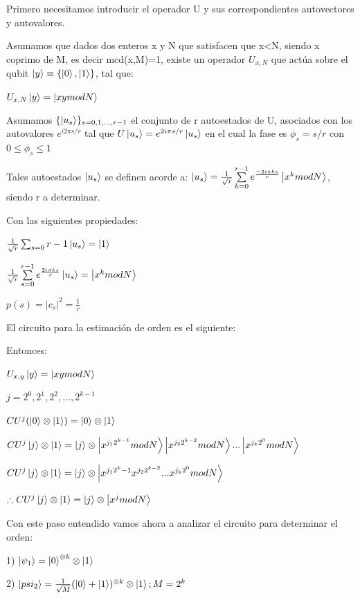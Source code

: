 \documentclass[11pt, spanish]{report}
\begin{document}
Primero necesitamos introducir el operador U y sus correspondientes autovectores y autovalores.

Asumamos que dados dos enteros x y N que satisfacen que x<N, siendo x coprimo de M, es decir mcd(x,M)=1, existe un operador $U_{x,N}$ que actúa sobre el qubit $\ket{y} \equiv \{\ket{0}, \ket{1}\}$, tal que:

$U_{x,N} \ket{y} = \ket{x y mod N}$

Asumamos $\{ \ket{u_s}\}_{s = 0, 1, ..., r-1}$ el conjunto de r autoestados de U, asociados con los autovalores $e^{i 2 \pi s/r}$ tal que $U \ket{u_s} = e^{2 i \pi s /r} \ket{u_s}$ en el cual la fase es $\phi_s = s/r$ con $0 \leq \phi_s \leq 1$

Tales autoestados $\ket{u_s}$ se definen acorde a: $\ket{u_s} = \frac{1}{\sqrt{r}} \sum\limits_{k=0}^{r-1} e^{\frac{-2 i \pi k s}{r}} \ket{x^k mod N}$, siendo r a determinar.

Con las siguientes propiedades:

$\frac{1}{\sqrt{r}} \sum_{s=0}{r-1} \ket{u_s} = \ket{1}$

$\frac{1}{\sqrt{r}} \sum\limits_{s=0}^{r-1} e^{\frac{2 i \pi k s}{r}} \ket{u_s} = \ket{x^k mod N}$

$p(s) = |c_s|^2 = \frac{1}{r}$

El circuito para la estimación de orden es el siguiente:


Entonces:

$U_{x,y} \ket{y} = \ket{x y mod N}$

$j = 2^0, 2^1, 2^2, ..., 2^{k-1}$

$CU^j (\ket{0} \otimes \ket{1}) = \ket{0} \otimes \ket{1}$

$CU^j \ket{j} \otimes \ket{1} = \ket{j} \otimes \ket{x^{j_1 2^{k-1}} mod N} \ket{x^{j_2 2^{k-2}} mod N} ... \ket{x^{j_k 2^0} mod N}$

$CU^j \ket{j} \otimes \ket{1} = \ket{j} \otimes \ket{x^{j_1 2^k-1} x^{j_2 2^{k-2}} ... x^{j_k 2^0} mod N}$

$\therefore CU^j \ket{j} \otimes \ket{1} = \ket{j} \otimes \ket{x^j mod N}$

Con este paso entendido vamos ahora a analizar el circuito para determinar el orden:

1) $\ket{\psi_1} = \ket{0}^{\otimes k} \otimes \ket{1}$

2) $\ket{psi_2} = \frac{1}{\sqrt{M}} (\ket{0} + \ket{1})^{\otimes k} \otimes \ket{1}; M=2^k$
\end{document}
